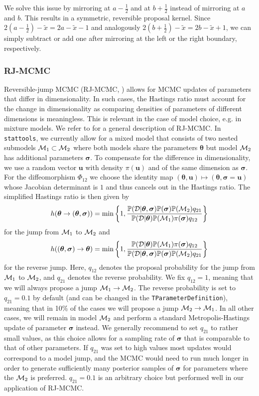 \documentclass[a4paper,11pt]{article}
\def\u{\boldsymbol{u}}
\def\bsigma{\boldsymbol{\sigma}}
\def\btheta{\boldsymbol{\theta}}
\def\D{{\cal D}}
\def\cM{{\cal M}}
\def\p{\mathbb{P}}
\def\stattools{\texttt{stattools}}
\newcommand{\class}[1]{\texttt{#1}}
\begin{document}
We solve this issue by mirroring at $a-\frac{1}{2}$ and at $b+\frac{1}{2}$ instead of mirroring at $a$ and $b$. This results in a symmetric, reversible proposal kernel. Since $2\left(a-\frac{1}{2}\right) - \tilde{x} = 2a - \tilde{x} - 1$ and analogously $2\left(b+\frac{1}{2}\right) - \tilde{x} = 2b - \tilde{x} + 1$, we can simply subtract or add one after mirroring at the left or the right boundary, respectively.

\subsubsection{RJ-MCMC}

Reversible-jump MCMC (RJ-MCMC, \citet{green1995}) allows for MCMC updates of parameters that differ in dimensionality. In such cases, the Hastings ratio must account for the change in dimensionality as comparing densities of parameters of different dimensions is meaningless. This is relevant in the case of model choice, e.g. in mixture models. We refer to \citet{Wegmann2019} for a general description of RJ-MCMC. In \stattools{}, we currently allow for a mixed model that consists of two nested submodels $\cM_1 \subset \cM_2$ where both models share the parameters $\btheta$ but model $\cM_2$ has additional parameters $\bsigma$. To compensate for the difference in dimensionality, we use a random vector $\u$ with density $\pi(\u)$ and of the same dimension as $\bsigma$. For the diffeomorphism $\Phi_{12}$ we choose the identity map $(\btheta,\u) \mapsto (\btheta, \bsigma = \u)$ whose Jacobian determinant is $1$ and thus cancels out in the Hastings ratio. The simplified Hastings ratio is then given by
$$
h(\btheta \to (\btheta, \bsigma))=\min\left\{1,\frac{\p(\D|\btheta, \bsigma)\p(\bsigma)\p(\cM_2)q_{21}}{\p(\D|\btheta)\p(\cM_1)\pi(\bsigma)q_{12}}\right\}
$$
for the jump from $\cM_1$ to $\cM_2$ and
$$
h((\btheta,\bsigma) \to \btheta)=\min\left\{1,\frac{\p(\D|\btheta)\p(\cM_1)\pi(\bsigma)q_{12}}{\p(\D|\btheta, \bsigma)\p(\bsigma)\p(\cM_2)q_{21}}\right\}
$$
for the reverse jump. Here, $q_{12}$ denotes the proposal probability for the jump from $\cM_1$ to $\cM_2$, and $q_{21}$ denotes the reverse probability. We fix $q_{12} = 1$, meaning that we will always propose a jump $\cM_1 \to \cM_2$. The reverse probability is set to $q_{21} = 0.1$ by default (and can be changed in the \class{TParameterDefinition}), meaning that in 10\% of the cases we will propose a jump $\cM_2 \to \cM_1$. In all other cases, we will remain in model $\cM_2$ and perform a standard Metropolis-Hastings update of parameter $\bsigma$ instead. We generally recommend to set $q_{21}$ to rather small values, as this choice allows for a sampling rate of $\bsigma$ that is comparable to that of other parameters. If $q_{21}$ was set to high values most updates would correspond to a model jump, and the MCMC would need to run much longer in order to generate sufficiently many posterior samples of $\bsigma$ for parameters where the $\cM_2$ is preferred. $q_{21} = 0.1$ is an arbitrary choice but performed well in our application of RJ-MCMC.
\end{document}
